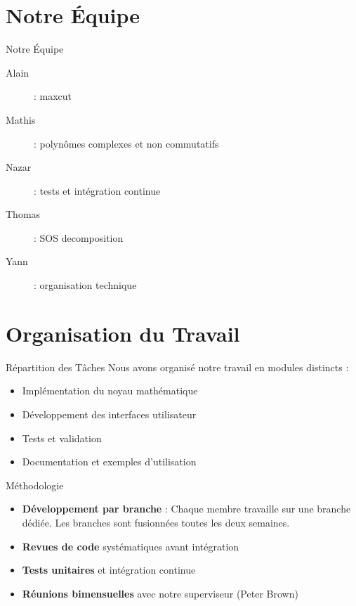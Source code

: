 \documentclass{beamer}
\begin{document}
\section{Notre Équipe}

\begin{frame}{Notre Équipe}
\begin{description}
    \item[Alain]: maxcut
    \item[Mathis]: polynômes complexes et non commutatifs
    \item[Nazar]: tests et intégration continue
    \item[Thomas]: SOS decomposition
    \item[Yann]: organisation technique
\end{description}
\end{frame}

\section{Organisation du Travail}

\begin{frame}{Répartition des Tâches}
Nous avons organisé notre travail en modules distincts :
\begin{itemize}
    \item Implémentation du noyau mathématique
    \item Développement des interfaces utilisateur
    \item Tests et validation
    \item Documentation et exemples d'utilisation
\end{itemize}
\end{frame}

\begin{frame}{Méthodologie}
\begin{itemize}
    \item \textbf{Développement par branche} : Chaque membre travaille sur une branche dédiée. Les branches sont fusionnées toutes les deux semaines.
    \item \textbf{Revues de code} systématiques avant intégration
    \item \textbf{Tests unitaires} et intégration continue
    \item \textbf{Réunions bimensuelles} avec notre superviseur (Peter Brown)
\end{itemize}
\end{frame}
\end{document}
